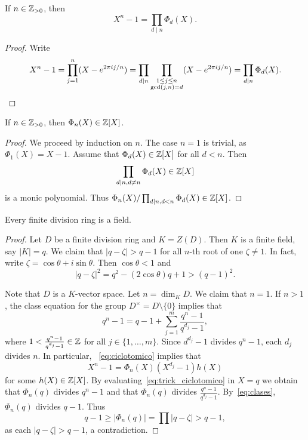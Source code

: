 \begin{lemma}
	If $n\in\mathbb{Z}_{>0}$, then
	\[
		X^n-1=\prod_{d\mid n}\Phi_d(X).
	\]
\end{lemma}

\begin{proof}
	Write 
	\[
		X^n-1=\prod_{j=1}^n (X-e^{2\pi ij/n})
		=\prod_{d\mid n}\prod_{\substack{1\leq j\leq n\\\gcd(j,n)=d}}(X-e^{2\pi ij/n})
		=\prod_{d\mid n}\Phi_d(X).\qedhere 
	\]
\end{proof}

\begin{lemma}
	If $n\in\mathbb{Z}_{>0}$, then $\Phi_n(X)\in\mathbb{Z}[X]$.
\end{lemma}

\begin{proof}
	We proceed by induction on $n$. The case $n=1$ is trivial, as 
	$\Phi_1(X)=X-1$. Assume that $\Phi_d(X)\in\mathbb{Z}[X]$ for all $d<n$.
	Then 
	\[
		\prod_{d\mid n,d\ne n}\Phi_d(X)\in\mathbb{Z}[X]
	\]
	is a monic polynomial. Thus $\Phi_n(X)/\prod_{d\mid
	n,d<n}\Phi_d(X)\in\mathbb{Z}[X]$.
\end{proof}

\begin{theorem}[Wedderburn]
\label{thm:Wedderburn} 
	Every finite division ring is a field. 
\end{theorem}

\begin{proof}
    Let $D$ be a finite division ring   
	and $K=Z(D)$. Then $K$ is a finite field, say $|K|=q$. 
	We claim that $|q-\zeta|>q-1$ for all $n$-th 
	root of one $\zeta\ne 1$.  In fact, write $\zeta=\cos\theta+i\sin\theta$. Then 
	$\cos\theta<1$ and 
	\[
	|q-\zeta|^2=q^2-(2\cos\theta)q+1>(q-1)^2.
	\]
	
	Note that
	$D$ is a $K$-vector space. Let 
	$n=\dim_KD$.  We claim that $n=1$. If $n>1$, the 
	class equation for the group 
	$D^\times=D\setminus\{0\}$ implies that 
	\begin{equation}
		\label{eq:clases}
		q^n-1=q-1+\sum_{j=1}^m \frac{q^n-1}{q^{d_j}-1},
	\end{equation}
	where $1<\frac{q^n-1}{q^{d_j}-1}\in\mathbb{Z}$ for all $j\in\{1,\dots,m\}$. 
	Since $d^{d_j}-1$ divides $q^n-1$, each $d_j$ divides $n$. In particular,
	~\eqref{eq:ciclotomico} implies that 
	\begin{equation}
		\label{eq:trick_ciclotomico}
		X^n-1=\Phi_n(X)(X^{d_j}-1)h(X)
	\end{equation}
	for some $h(X)\in\mathbb{Z}[X]$. 
	By evaluating~\eqref{eq:trick_ciclotomico} in $X=q$  
	we obtain that $\Phi_n(q)$ divides $q^n-1$ and that $\Phi_n(q)$
	divides $\frac{q^n-1}{q^{d_j}-1}$. By~\eqref{eq:clases}, 
	$\Phi_n(q)$ divides $q-1$. 
	Thus  
	\[
		q-1\geq |\Phi_n(q)|=\prod |q-\zeta|>q-1,
	\]
	as each $|q-\zeta|>q-1$, 
	a contradiction. 
\end{proof}


